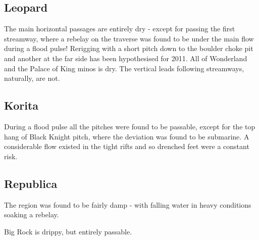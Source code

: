 \subsection{Leopard}

The main horizontal passages are entirely dry - except for passing
the first streamway, where a rebelay on the traverse was found to
be under the main flow during a flood pulse! Rerigging with a short
pitch down to the boulder choke pit and another at the far side has
been hypothesised for 2011. All of Wonderland and the Palace of King
minos is dry. The vertical leads following streamways, naturally,
are not.


\subsection{Korita}

During a flood pulse all the pitches were found to be passable, except
for the top hang of Black Knight pitch, where the deviation was found
to be submarine. A considerable flow existed in the tight rifts and
so drenched feet were a constant risk.


\subsection{Republica}

The region was found to be fairly damp - with falling water in heavy conditions
soaking a rebelay. 

Big Rock is drippy, but entirely passable.
